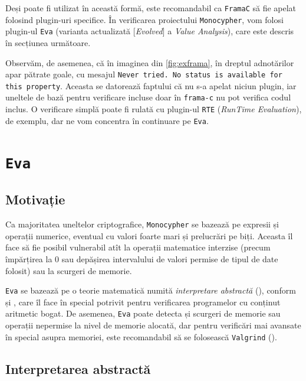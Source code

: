 Deși poate fi utilizat în această formă, este recomandabil ca \texttt{FramaC} să fie
apelat folosind plugin-uri specifice. În verificarea proiectului \texttt{Monocypher},
vom folosi plugin-ul \texttt{Eva} (varianta actualizată [\emph{Evolved}] a
\emph{Value Analysis}), care este descris în secțiunea următoare.

Observăm, de asemenea, că în imaginea din \ref{fig:exframa}, în dreptul adnotărilor
apar pătrate goale, cu mesajul \texttt{Never tried. No status is available for %
  this property}. Aceasta se datorează faptului că nu s-a apelat niciun plugin,
iar uneltele de bază pentru verificare incluse doar în \texttt{frama-c} nu pot
verifica codul inclus. O verificare simplă poate fi rulată cu plugin-ul \texttt{RTE}
(\emph{RunTime Evaluation}), de exemplu, dar ne vom concentra în continuare
pe \texttt{Eva}.



\newpage
\section{\texttt{Eva}}

\subsection{Motivație}
\indent\indent Ca majoritatea uneltelor criptografice, \texttt{Monocypher}
se bazează pe expresii și operații numerice, eventual cu valori foarte
mari și prelucrări pe biți. Aceasta îl face să fie posibil vulnerabil
atît la operații matematice interzise (precum împărțirea la 0 sau depășirea
intervalului de valori permise de tipul de date folosit) sau la scurgeri de memorie.

\texttt{Eva} se bazează pe o teorie matematică numită \emph{interpretare abstractă}
(\cite{wikiabs}), conform și \cite{eva}, care îl face în special potrivit
pentru verificarea programelor cu conținut aritmetic bogat. De asemenea,
\texttt{Eva} poate detecta și scurgeri de memorie sau operații nepermise la nivel
de memorie alocată, dar pentru verificări mai avansate în special asupra memoriei,
este recomandabil să se folosească \texttt{Valgrind} (\cite{valgrind}).


\subsection{Interpretarea abstractă}


